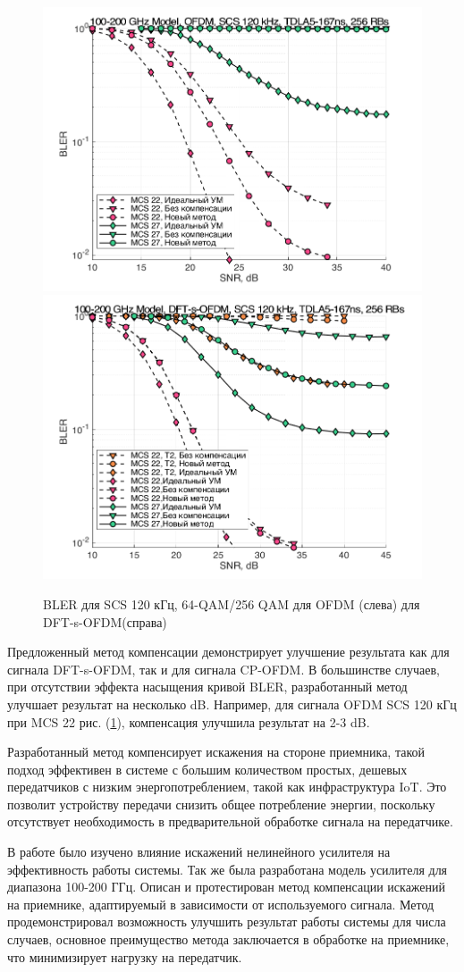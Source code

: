 \begin{figure}[h!]
    \centering
    \includegraphics[width=0.49\linewidth]{figs/res/ofdm/OFDM_SubTHz_SCS120_MCS22_27.png}
    \includegraphics[width=0.49\linewidth]{figs/res/dftsofdm/DFT-s-OFDM_SubTHz_SCS120_MCS22_27.png}
    \caption{BLER для SCS 120 кГц, 64-QAM/256 QAM для OFDM (слева) для DFT-s-OFDM(справа)}
    \label{fig:res100200_scs120}
\end{figure}

Предложенный метод компенсации демонстрирует улучшение результата как для
сигнала DFT-s-OFDM, так и для сигнала CP-OFDM. В большинстве случаев, при
отсутствии эффекта насыщения кривой BLER, разработанный метод улучшает
результат на несколько dB. Например, для сигнала OFDM SCS 120 кГц при MCS
22 рис. (\ref{fig:res100200_scs120}), компенсация улучшила результат на 2-3
dB.

Разработанный метод компенсирует искажения на стороне приемника, такой подход
эффективен в системе с большим количеством простых, дешевых передатчиков с
низким энергопотреблением, такой как инфраструктура IoT. Это позволит
устройству передачи снизить общее потребление энергии, поскольку
отсутствует необходимость в предварительной обработке сигнала на
передатчике.

В работе было изучено влияние искажений нелинейного усилителя на
эффективность работы системы. Так же была разработана модель усилителя для
диапазона 100-200 ГГц. Описан и протестирован метод компенсации искажений
на приемнике, адаптируемый в зависимости от используемого сигнала. Метод
продемонстрировал возможность улучшить результат работы системы для числа
случаев, основное преимущество метода заключается в обработке на приемнике,
что минимизирует нагрузку на передатчик.